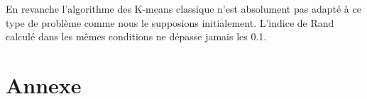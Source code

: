 \documentclass[a4paper, titlepage]{report}
\begin{document}
\begin{figure}[h]
\begin{center}
	\end{center}
\end{figure}

En revanche l'algorithme des K-means classique n'est absolument pas adapté à ce type de problème comme nous le supposions initialement. L'indice de Rand calculé dans les mêmes conditions ne dépasse jamais les 0.1.




\chapter*{Annexe}

\end{document}
